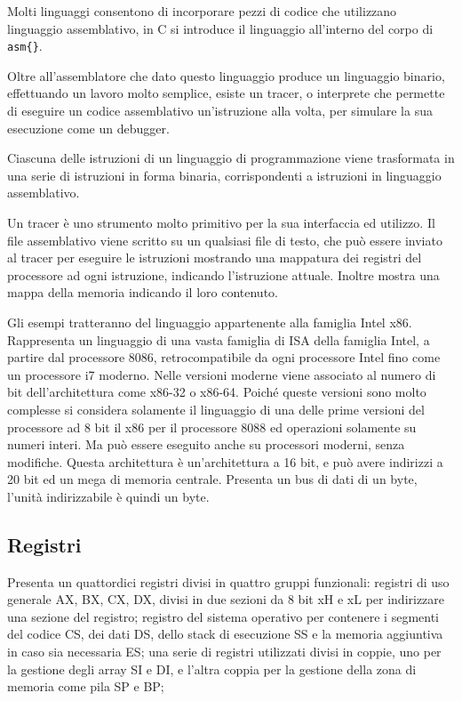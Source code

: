 \documentclass{article}
\numberwithin{equation}{subsection}
\begin{document}
Molti linguaggi consentono di incorporare pezzi di codice che utilizzano linguaggio assemblativo, in C si introduce il linguaggio all'interno del corpo di \verb|asm{}|. 

Oltre all'assemblatore che dato questo linguaggio produce un linguaggio binario, effettuando un lavoro molto semplice, esiste un tracer, o interprete che permette di eseguire un 
codice assemblativo un'istruzione alla volta, per simulare la sua esecuzione come un debugger. 

Ciascuna delle istruzioni di un linguaggio di programmazione viene trasformata in una serie di istruzioni in forma binaria, corrispondenti a istruzioni in linguaggio 
assemblativo. 

Un tracer è uno strumento molto primitivo per la sua interfaccia ed utilizzo. Il file assemblativo viene scritto su un qualsiasi file di testo, che può essere inviato 
al tracer per eseguire le istruzioni mostrando una mappatura dei registri del processore ad ogni istruzione, indicando l'istruzione attuale. Inoltre mostra una mappa della 
memoria indicando il loro contenuto. 

Gli esempi tratteranno del linguaggio appartenente alla famiglia Intel x86. Rappresenta un linguaggio di una vasta famiglia di ISA della famiglia Intel, a partire dal 
processore 8086, retrocompatibile da ogni processore Intel fino come un processore i7 moderno. 
Nelle versioni moderne viene associato al numero di bit dell'architettura come x86-32 o x86-64. 
Poiché queste versioni sono molto complesse si considera solamente il linguaggio di una delle prime versioni del processore ad 8 bit il x86 per il processore 8088 ed operazioni 
solamente su numeri interi. 
Ma può essere eseguito anche su processori moderni, senza modifiche. 
Questa architettura è un'architettura a 16 bit, e può avere indirizzi a 20 bit ed un mega di memoria centrale. Presenta un bus di dati di un byte, l'unità indirizzabile è quindi 
un byte. 

\subsection{Registri}

Presenta un quattordici registri divisi in quattro gruppi funzionali: registri di uso generale AX, BX, CX, DX, divisi in due sezioni da 8 bit xH e xL per indirizzare una sezione 
del registro; registro del sistema operativo per contenere i segmenti del 
codice CS, dei dati DS, dello stack di esecuzione SS e la memoria aggiuntiva in caso sia necessaria ES; una serie di registri utilizzati divisi in coppie, uno per la 
gestione degli array SI e DI, e l'altra coppia per la gestione della zona di memoria come pila SP e BP; 
\end{document}
